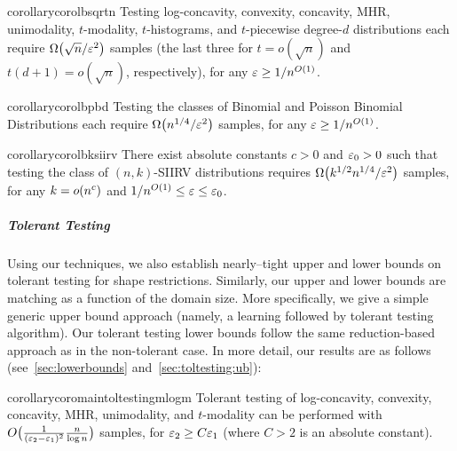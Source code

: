 \begin{restatable}{corollary}{corolbsqrtn}\label{coro:lb:sqrtn}
  Testing log-concavity, convexity, concavity, MHR, unimodality, $t$-modality, $t$-histograms, and $t$-piecewise degree-$d$ distributions each require $\bigOmega{{\sqrt{n}}/{\eps^2}}$ samples (the last three for $t = o(\sqrt{n})$ and $t(d+1) = o(\sqrt{n})$, respectively), for any $\varepsilon\geq 1/n^{O(1)}$.
\end{restatable}

\begin{restatable}{corollary}{corolbpbd}\label{coro:lb:pbd}
  Testing the classes of Binomial and Poisson Binomial Distributions each require $\bigOmega{{n^{1/4}}/{\eps^2}}$ samples, for any $\varepsilon\geq 1/n^{O(1)}$.
\end{restatable}

\begin{restatable}{corollary}{corolbksiirv}\label{coro:lb:ksiirv}
  There exist absolute constants $c>0$ and $\varepsilon_0 > 0$ such that testing the class of $(n,k)$-SIIRV distributions requires $\Omega\big( k^{1/2}n^{1/4}/\varepsilon^2 \big)$ samples, for any $k=\littleO{n^c}$ and ${1}/{n^{O(1)}} \leq \varepsilon \leq \varepsilon_0$.
\end{restatable}

\subparagraph{Tolerant Testing} 
Using our techniques, we also establish nearly--tight upper and lower bounds on tolerant testing for shape restrictions. 
Similarly, our upper and lower bounds are matching as a function of the domain size.
More specifically, we give a simple generic upper bound approach (namely, a learning followed by tolerant testing algorithm).
Our tolerant testing lower bounds follow the same reduction-based approach as in the non-tolerant case. 
In more detail, our results are as follows (see~\cref{sec:lowerbounds} and~\cref{sec:toltesting:ub}):

\begin{restatable}{corollary}{coromaintoltestingmlogm}\label{coro:main:tol:testing:mlogm}
Tolerant testing of log-concavity, convexity, concavity, MHR, unimodality, and $t$-modality can be performed with $O\big( \frac{1}{(\varepsilon_2-\varepsilon_1)^2}\frac{n}{\log n} \big)$ samples, for $\varepsilon_2 \geq C \varepsilon_1$ (where $C>2$ is an absolute constant).
\end{restatable}

